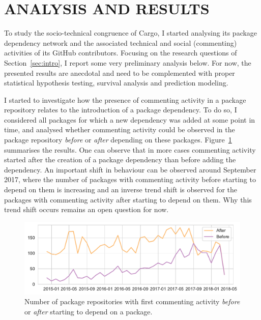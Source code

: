 \section{ANALYSIS AND RESULTS}

To study the socio-technical congruence of Cargo, I started analysing its package dependency network and the associated technical and social (commenting) activities of its GitHub contributors.
Focusing on the research questions of Section~\ref{sec:intro}, I report some very preliminary analysis below.
For now, the presented results are anecdotal and need to be complemented with proper statistical hypothesis testing, survival analysis and prediction modeling.

I started to investigate how the presence of commenting activity in a package repository relates to the introduction of a package dependency.
To do so, I considered all packages for which a new dependency was added at some point in time, and analysed whether commenting activity could be observed in the package repository \emph{before} or \emph{after} depending on these packages. Figure~\ref{fig:fig1} summarises the results. One can observe that in more cases commenting activity started after the creation of a package dependency than before adding the dependency. 
An important shift in behaviour can be observed around September 2017, where the number of packages with commenting activity before starting to depend on them is increasing and an inverse trend shift is observed for the packages with commenting activity  after starting to depend on them. Why this trend shift occurs remains an open question for now.

\begin{figure}[thb]
\vspace{-0.3cm}
    \includegraphics[width=0.9\columnwidth]{Photos/RQ21.pdf} 
    \caption{Number of package repositories with first commenting activity \emph{before} or \emph{after} starting to depend on a package.}
    \label{fig:fig1}
\end{figure}

